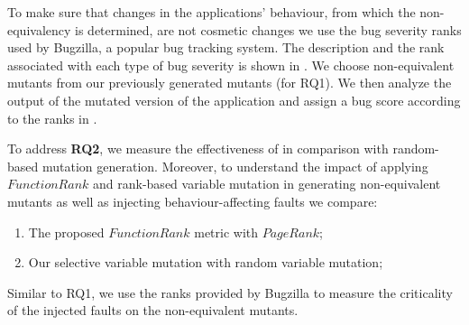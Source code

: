 To make sure that changes in the applications' behaviour, from which the non-equivalency is determined, are not cosmetic changes we use the bug severity ranks used by Bugzilla, a popular bug
tracking system. %
The description and the rank associated with each type of bug severity is shown in . We choose non-equivalent mutants from our previously generated mutants (for RQ1). We then analyze the output of the mutated version of the application and assign a bug score according to the ranks in .

To address \textbf{RQ2}, we measure the effectiveness of \mutandis in comparison with random-based mutation generation. Moreover, to understand the impact of applying $FunctionRank$ and rank-based variable mutation in generating non-equivalent mutants as well as injecting behaviour-affecting faults we compare:
\begin{enumerate} 
\item The proposed $FunctionRank$ metric with $PageRank$;
\item Our selective variable mutation with random variable mutation;
\end{enumerate}
Similar to RQ1, we use the ranks provided by Bugzilla to measure the criticality of the injected faults on the non-equivalent mutants.  

